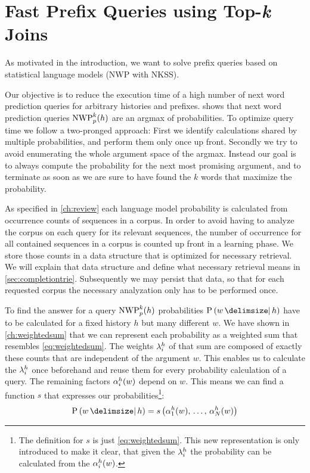 \chapter{Fast Prefix Queries using Top-\emph{k} Joins}
\label{ch:topkjoin}


\begin{draft}
As motivated in the introduction, we want to solve prefix queries based
on statistical language models (NWP with NKSS).
\end{draft}

Our objective is to reduce the execution time of a high number of next word
prediction queries for arbitrary histories and prefixes.
 shows that next word prediction queries $\NWP[p][k](h)$
are an argmax of probabilities.
To optimize query time we follow a two-pronged approach:
First we identify calculations shared by multiple probabilities, and perform
them only once up front.
Secondly we try to avoid enumerating the whole argument space of the argmax.
Instead our goal is to always compute the probability for the next most
promising argument, and to terminate as soon as we are sure to have found the
$k$ words that maximize the probability.

As specified in \cref{ch:review} each language model probability  is calculated
from occurrence counts of sequences in a corpus.
In order to avoid having to analyze the corpus on each query for its relevant
sequences, the number of occurrence for all contained sequences in a corpus is
counted up front in a learning phase.
We store those counts in a data structure that is optimized for necessary
retrieval.
We will explain that data structure and define what necessary retrieval means
in \cref{sec:completiontrie}.
Subsequently we may persist that data, so that for each requested corpus the
necessary analyzation only has to be performed once.

To find the answer for a query $\NWP[p][k]{h}$ probabilities $\Prob{w}{h}$ have
to be calculated for a fixed history $h$ but many different $w$.
We have shown in \cref{ch:weightedsum} that we can represent each probability
as a weighted sum that resembles \cref{eq:weightedsum}.
The weights $\lambda^h_i$ of that sum are composed of exactly these counts
that are independent of the argument $w$.
This enables us to calculate the $\lambda_i^h$ once beforehand and reuse them
for every probability calculation of a query.
The remaining factors $\alpha^h_i(w)$ depend on $w$.
This means we can find a function $s$ that expresses our
probabilities\footnote{The definition for $s$ is just \cref{eq:weightedsum}.
This new representation is only introduced to make it clear, that given the
$\lambda^h_i$ the probability can be calculated from the $\alpha^h_i(w)$.}:
\begin{equation}
  \label{eq:scoringfunc}
  \Prob{w}{h} = s\left(\SumArg^h_1(w), \, \ldots, \, \SumArg^h_N(w)\right)
\end{equation}

